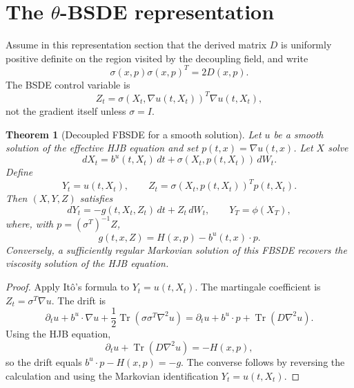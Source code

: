 \documentclass[12pt, letterpaper]{amsart}
\providecommand{\Tr}{\operatorname{Tr}}
\theoremstyle{plain}
\newtheorem{theorem}{Theorem}[section]
\theoremstyle{definition}
\theoremstyle{remark}
\begin{document}
\section{The \texorpdfstring{$\theta$}{theta}-BSDE representation}
\label{sec:theta_bsde_corrected}

Assume in this representation section that the derived matrix $D$ is uniformly positive definite on the region visited by the decoupling field, and write
\begin{equation}
    \sigma(x,p)\sigma(x,p)^T=2D(x,p).
\end{equation}
The BSDE control variable is
\begin{equation}
    Z_t=\sigma(X_t,\nabla u(t,X_t))^T\nabla u(t,X_t),
\end{equation}
not the gradient itself unless $\sigma=I$.

\begin{theorem}[Decoupled FBSDE for a smooth solution]
\label{thm:fbsde_corrected}
Let $u$ be a smooth solution of the effective HJB equation and set $p(t,x)=\nabla u(t,x)$.  Let $X$ solve
\begin{equation}
    dX_t=b^u(t,X_t)\,dt+\sigma(X_t,p(t,X_t))\,dW_t.
\end{equation}
Define
\begin{equation}
    Y_t=u(t,X_t),\qquad
    Z_t=\sigma(X_t,p(t,X_t))^Tp(t,X_t).
\end{equation}
Then $(X,Y,Z)$ satisfies
\begin{equation}
    dY_t=-g(t,X_t,Z_t)\,dt+Z_t\,dW_t,
    \qquad Y_T=\phi(X_T),
\end{equation}
where, with $p=(\sigma^T)^{-1}Z$,
\begin{equation}
    g(t,x,Z)=H(x,p)-b^u(t,x)\cdot p .
\end{equation}
Conversely, a sufficiently regular Markovian solution of this FBSDE recovers the viscosity solution of the HJB equation.
\end{theorem}

\begin{proof}
Apply It\^o's formula to $Y_t=u(t,X_t)$.  The martingale coefficient is $Z_t=\sigma^T\nabla u$.  The drift is
\begin{equation}
    \partial_tu+b^u\cdot\nabla u+\frac12\Tr(\sigma\sigma^T\nabla^2u)
    =\partial_tu+b^u\cdot p+\Tr(D\nabla^2u).
\end{equation}
Using the HJB equation,
\begin{equation}
    \partial_tu+\Tr(D\nabla^2u)=-H(x,p),
\end{equation}
so the drift equals $b^u\cdot p-H(x,p)=-g$.  The converse follows by reversing the calculation and using the Markovian identification $Y_t=u(t,X_t)$.
\end{proof}
\end{document}
